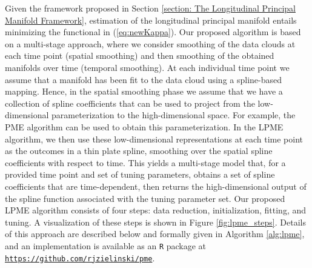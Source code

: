 \documentclass[11pt,reqno]{article}
\theoremstyle{definition}
\begin{document}
Given the framework proposed in Section \ref{section: The Longitudinal Principal Manifold Framework}, estimation of the longitudinal principal manifold entails minimizing the functional in (\ref{eq:newKappa}). Our proposed algorithm is based on a multi-stage approach, where we consider smoothing of the data clouds at each time point (spatial smoothing) and then smoothing of the obtained manifolds over time (temporal smoothing). At each individual time point we assume that a manifold has been fit to the data cloud using a spline-based mapping. Hence, in the spatial smoothing phase we assume that we have a collection of spline coefficients that can be used to project from the low-dimensional parameterization to the high-dimensional space. For example, the PME algorithm can be used to obtain this parameterization. In the LPME algorithm, we then use these low-dimensional representations at each time point as the outcomes in a thin plate spline, smoothing over the spatial spline coefficients with respect to time. This yields a multi-stage model that, for a provided time point and set of tuning parameters, obtains a set of spline coefficients that are time-dependent, then returns the high-dimensional output of the spline function associated with the tuning parameter set. Our proposed LPME algorithm consists of four steps: data reduction, initialization, fitting, and tuning. A visualization of these steps is shown in Figure \ref{fig:lpme_steps}. Details of this approach are described below and formally given in Algorithm \ref{alg:lpme}, and an implementation is available as an \texttt{R} package at \href{https://github.com/rjzielinski/pme}{\texttt{https://github.com/rjzielinski/pme}}.
\end{document}
